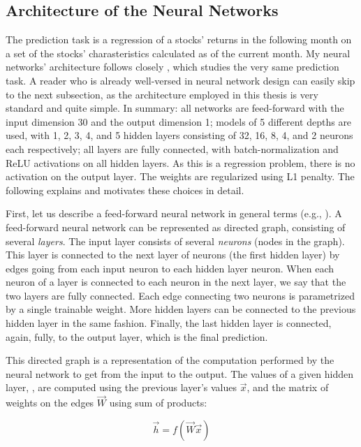 	\subsection{Architecture of the Neural Networks}
	
	The prediction task is a regression of a stocks' returns in the following month on a set of the stocks' charasteristics calculated as of the current month. My neural networks' architecture follows closely \cite{gu2020empirical}, which studies the very same prediction task. A reader who is already well-versed in neural network design can easily skip to the next subsection, as the architecture employed in this thesis is very standard and quite simple. In summary: all networks are feed-forward with the input dimension 30 and the output dimension 1; models of 5 different depths are used, with 1, 2, 3, 4, and 5 hidden layers consisting of 32, 16, 8, 4, and 2 neurons each respectively; all layers are fully connected, with batch-normalization \citep{ioffe2015batch} and ReLU activations on all hidden layers. As this is a regression problem, there is no activation on the output layer. The weights are regularized using L1 penalty. The following explains and motivates these choices in detail.
	
	First, let us describe a feed-forward neural network in general terms (e.g., \cite{goodfellow2016deep}). A feed-forward neural network can be represented as directed graph, consisting of several \textit{layers}. The input layer consists of several \textit{neurons} (nodes in the graph). This layer is connected to the next layer of neurons (the first hidden layer) by edges going from each input neuron to each hidden layer neuron. When each neuron of a layer is connected to each neuron in the next layer, we say that the two layers are fully connected. Each edge connecting two neurons is parametrized by a single trainable weight. More hidden layers can be connected to the previous hidden layer in the same fashion. Finally, the last hidden layer is connected, again, fully, to the output layer, which is the final prediction.
	
	This directed graph is a representation of the computation performed by the neural network to get from the input to the output. The values of a given hidden layer, , are computed using the previous layer's values $\vec{x}$, and the matrix of weights on the edges $\vec{W}$ using sum of products: 
	
	\begin{equation}
		\vec{h} = f(\vec{W}\vec{x})
	\end{equation}
	
